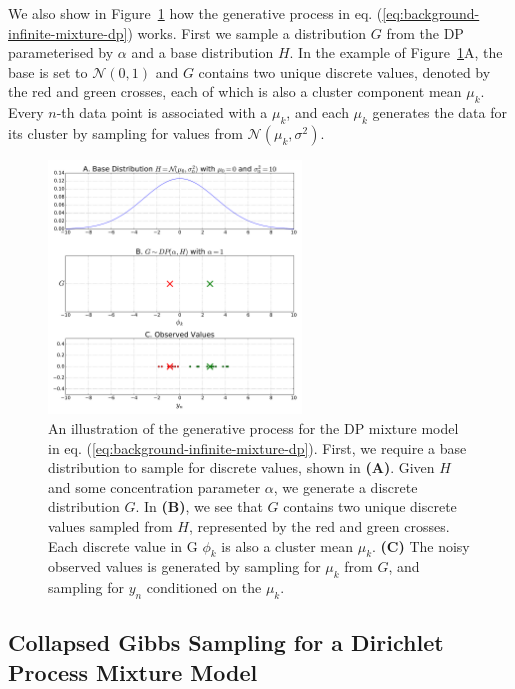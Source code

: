 We also show in Figure~\ref{fig:g-from-dp} how the generative process in eq. (\ref{eq:background-infinite-mixture-dp}) works. First we sample a distribution $G$ from the DP parameterised by $\alpha$ and a base distribution $H$. In the example of Figure~\ref{fig:g-from-dp}A, the base is set to $\mathcal{N}(0, 1)$ and $G$ contains two unique discrete values, denoted by the red and green crosses, each of which is also a cluster component mean $\mu_k$. Every $n$-th data point is associated with a $\mu_k$, and each $\mu_k$ generates the data for its cluster by sampling for values from $\mathcal{N}(\mu_k, \sigma^2)$. 
\begin{figure}
\noindent \begin{centering}
\includegraphics[width=0.6\textwidth]{03-machine-learning/figures/dp_samples.pdf}
\par\end{centering}
\caption{\label{fig:g-from-dp}An illustration of the generative process for the DP mixture model in eq. (\ref{eq:background-infinite-mixture-dp}). First, we require a base distribution to sample for discrete values, shown in \textbf{(A)}. Given $H$ and some concentration parameter $\alpha$, we generate a discrete distribution $G$. In \textbf{(B)}, we see that $G$ contains two unique discrete values sampled from $H$, represented by the red and green crosses. Each discrete value in G $\phi_k$ is also a cluster mean $\mu_k$. \textbf{(C)} The noisy observed values is generated by sampling for $\mu_k$ from $G$, and sampling for $y_n$ conditioned on the $\mu_k$.}
\end{figure}

\subsection{Collapsed Gibbs Sampling for a Dirichlet Process Mixture Model \label{background-cgs-dpmixture}}

